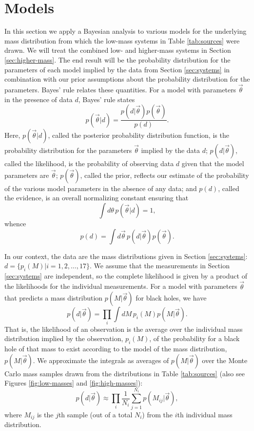 \documentclass[preprint]{aastex}
\newcommand{\vtheta}{\vec{\theta}}
\begin{document}
\section{Models}
\label{sec:models}

In this section we apply a Bayesian analysis to various models for the
underlying mass distribution from which the low-mass systems in Table
\ref{tab:sources} were drawn.  We will treat the combined low- and
higher-mass systems in Section \ref{sec:higher-mass}.  The end result
will be the probability distribution for the parameters of each model
implied by the data from Section \ref{sec:systems} in combination with
our prior assumptions about the probability distribution for the
parameters.  Bayes' rule relates these quantities.  For a model with
parameters $\vtheta$ in the presence of data $d$, Bayes' rule states
\begin{equation}
  \label{eq:Bayes-rule}
  p(\vtheta | d) = \frac{p(d | \vtheta) p(\vtheta)}{p(d)}.
\end{equation}
Here, $p(\vtheta|d)$, called the posterior probability distribution
function, is the probability distribution for the parameters $\vtheta$
implied by the data $d$; $p(d|\vtheta)$, called the likelihood, is the
probability of observing data $d$ given that the model parameters are
$\vtheta$; $p(\vtheta)$, called the prior, reflects our estimate of the
probability of the various model parameters in the absence of any
data; and $p(d)$, called the evidence, is an overall normalizing
constant ensuring that
\begin{equation}
  \int d\theta\, p(\vtheta|d) = 1,
\end{equation}
whence
\begin{equation}
  \label{eq:evidence-def}
  p(d) = \int d\vtheta\, p(d|\vtheta) p(\vtheta).
\end{equation}

In our context, the data are the mass distributions given in Section
\ref{sec:systems}: $d = \{ p_i(M)| i = 1, 2, \ldots, 17 \}$.  We
assume that the measurements in Section \ref{sec:systems} are
independent, so the complete likelihood is given by a product of the
likelihoods for the individual measurements.  For a model with
parameters $\vtheta$ that predicts a mass distribution $p(M|\vtheta)$
for black holes, we have
\begin{equation}
  \label{eq:likelihood-def}
  p(d|\vtheta) = \prod_i \int dM\, p_i(M) p(M|\vtheta).
\end{equation}
That is, the likelihood of an observation is the average over the
individual mass distribution implied by the observation, $p_i(M)$, of
the probability for a black hole of that mass to exist according to
the model of the mass distribution, $p(M | \vtheta)$.  We approximate
the integrals as averages of $p(M|\vtheta)$ over the Monte Carlo mass
samples drawn from the distributions in Table \ref{tab:sources} (also
see Figures \ref{fig:low-masses} and \ref{fig:high-masses}):
\begin{equation}
  p(d|\vtheta) \approx \prod_i \frac{1}{N_i} \sum_{j = 1}^{N_i} p(M_{ij} | \vtheta),
\end{equation}
where $M_{ij}$ is the $j$th sample (out of a total $N_i$) from the
$i$th individual mass distribution.
\end{document}

